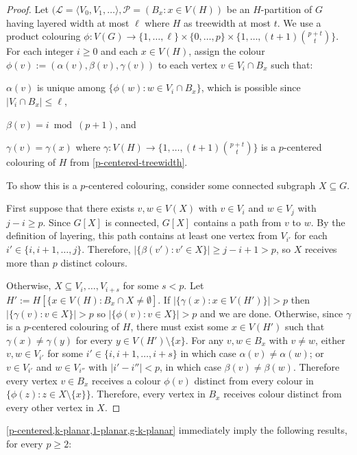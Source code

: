 \documentclass{patmorin}
\renewcommand{\ge}{\geqslant}
\renewcommand{\le}{\leqslant}
\begin{document}
\begin{proof}
  Let $(\mathcal{L}=\langle V_0,V_1,\ldots\rangle, \mathcal{P}=(B_x:x\in V(H))$ be an $H$-partition of $G$ having layered width at most $\ell$ where $H$ as treewidth at most $t$.
  We use a product colouring $\phi:V(G)\to \{1,\ldots,\ell\}\times\{0,\ldots,p\}\times\{1,\ldots,
  (t+1)\binom{p+t}{t}\}$.  For each integer $i\ge 0$ and each $x\in V(H)$, assign the colour $\phi(v):=(\alpha(v),\beta(v),\gamma(v))$ to each vertex $v\in V_i\cap B_x$ such that:
  \begin{compactenum}
    \item $\alpha(v)$ is unique among $\{\phi(w): w\in V_i\cap B_x\}$, which is possible 
    since $|V_i\cap B_x|\le \ell$,
    \item $\beta(v)= i\bmod (p+1)$, and     
    \item $\gamma(v)=\gamma(x)$ where $\gamma:V(H)\to\{1,\ldots,(t+1)\binom{p+t}{t}\}$ is a $p$-centered colouring of $H$ from     \cref{p-centered-treewidth}.
  \end{compactenum}
To show this is a $p$-centered colouring, consider some connected subgraph $X\subseteq G$.
  
First suppose that there exists $v,w\in V(X)$ with $v\in V_i$ and $w\in V_j$ with $j-i\ge p$. Since $G[X]$ is connected, $G[X]$ contains a path from $v$ to $w$.  By the definition of layering, this path contains at least one vertex from $V_{i'}$ for each $i'\in\{i,i+1,\ldots,j\}$. Therefore, $|\{\beta(v'):v'\in X\}|\ge j-i+1 > p$, so $X$ receives more than $p$ distinct colours.
    
Otherwise, $X\subseteq V_{i},\ldots,V_{i+s}$ for some $s<p$.  Let $H':=H[\{x\in V(H):B_x\cap X\neq\emptyset]$.  If $|\{\gamma(x):x\in V(H')\}| > p$ then $|\{\gamma(v):v\in X\}|> p$ so $|\{\phi(v):v\in X\}|> p$ and we are done.  Otherwise, since $\gamma$ is a $p$-centered colouring of $H$, there must exist some $x\in V(H')$ such that $\gamma(x)\neq\gamma(y)$ for every $y\in V(H')\setminus\{x\}$.
    For any $v,w\in B_x$ with $v\neq w$, either $v,w\in V_{i'}$ for some $i'\in\{i,i+1,\ldots,i+s\}$ in which case $\alpha(v)\neq\alpha(w)$; or $v\in V_{i'}$ and $w\in V_{i''}$ with $|i'-i''|< p$, in which case $\beta(v)\neq\beta(w)$. Therefore every vertex $v\in B_x$ receives a colour $\phi(v)$ distinct from every colour in $\{\phi(z):z\in X\setminus\{x\}\}$. Therefore, every vertex in $B_x$ receives colour distinct from every other vertex in $X$.\end{proof}

\cref{p-centered,k-planar,1-planar,g-k-planar} immediately imply the following results, for every $p\ge 2$:
\end{document}
